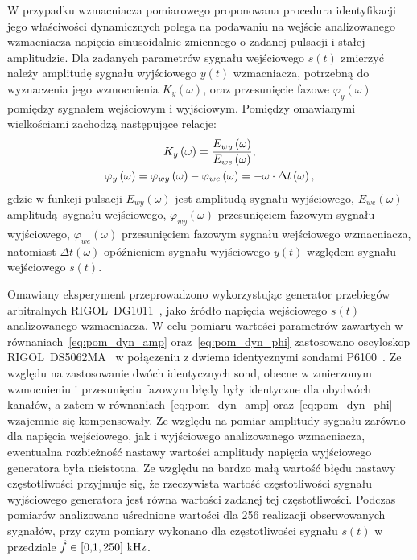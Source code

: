 W przypadku wzmacniacza pomiarowego proponowana procedura identyfikacji jego właściwości dynamicznych polega na podawaniu na wejście analizowanego wzmacniacza napięcia sinusoidalnie zmiennego o zadanej pulsacji i stałej amplitudzie. Dla zadanych parametrów sygnału wejściowego $s(t)$ zmierzyć należy amplitudę sygnału wyjściowego $y(t)$ wzmacniacza, potrzebną do wyznaczenia jego wzmocnienia $K_{y}(\omega)$, oraz przesunięcie fazowe $\varphi_{y}(\omega)$ pomiędzy sygnałem wejściowym i wyjściowym. Pomiędzy omawianymi wielkościami zachodzą następujące relacje:
\begin{gather}
K_{y} \left(\omega\right) = \frac{E_{wy} \left(\omega\right)}{E_{we} \left(\omega\right)} \label{eq:pom_dyn_amp}, \\
\varphi_{y} \left(\omega\right) = \varphi_{wy} \left(\omega\right) - \varphi_{we} \left(\omega\right) = -\omega \cdot \Delta t \left(\omega\right) \label{eq:pom_dyn_phi},
\end{gather}
gdzie w funkcji pulsacji $E_{wy}(\omega)$ jest amplitudą sygnału wyjściowego, $E_{we}(\omega)$ amplitudą sygnału wejściowego, $\varphi_{wy}(\omega)$ przesunięciem fazowym sygnału wyjściowego, $\varphi_{we}(\omega)$ przesunięciem fazowym sygnału wejściowego wzmacniacza, natomiast $\Delta t(\omega)$ opóźnieniem sygnału wyjściowego $y(t)$ względem sygnału wejściowego $s(t)$.

Omawiany eksperyment przeprowadzono wykorzystując generator przebiegów arbitralnych RIGOL~DG1011~\cite{rigol_fawg}, jako źródło napięcia wejściowego $s(t)$ analizowanego wzmacniacza. W celu pomiaru wartości parametrów zawartych w równaniach~\eqref{eq:pom_dyn_amp} oraz~\eqref{eq:pom_dyn_phi} zastosowano oscyloskop RIGOL~DS5062MA~\cite{rigol_dso} w połączeniu z dwiema identycznymi sondami P6100~\cite{wellzion_probes}. Ze względu na zastosowanie dwóch identycznych sond, obecne w zmierzonym wzmocnieniu i przesunięciu fazowym błędy były identyczne dla obydwóch kanałów, a zatem w równaniach~\eqref{eq:pom_dyn_amp} oraz~\eqref{eq:pom_dyn_phi} wzajemnie się kompensowały. Ze względu na pomiar amplitudy sygnału zarówno dla napięcia wejściowego, jak i wyjściowego analizowanego wzmacniacza, ewentualna rozbieżność nastawy wartości amplitudy napięcia wyjściowego generatora była nieistotna. Ze względu na bardzo małą wartość błędu nastawy częstotliwości przyjmuje się, że rzeczywista wartość częstotliwości sygnału wyjściowego generatora jest równa wartości zadanej tej częstotliwości. Podczas pomiarów analizowano uśrednione wartości dla \num{256} realizacji obserwowanych sygnałów, przy czym pomiary wykonano dla częstotliwości sygnału $s(t)$ w przedziale $\hat{f} \in \interval{\num{0.1}}{\num{250}}~\unit{kHz}$.

